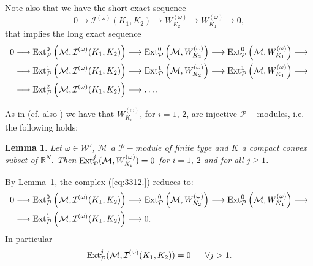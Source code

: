 \documentclass[twoside]{amsart}
\newtheorem{Lemma}[Th]{Lemma}
\begin{document}
Note also that we have the short exact sequence
\[
0\longrightarrow{\mathcal{I}}^{(\omega)}(K_{1},K_{2})\longrightarrow W_{K_{2}}^{(\omega)}
\longrightarrow W_{K_{1}}^{(\omega)}\longrightarrow0,
\]
that implies the long exact sequence
\begin{align}
  0\longrightarrow{\mathop{\rm Ext}\nolimits}_{{\mathcal P}}^{0}\left({\mathcal{M}},{\mathcal{I}}^{(\omega)}(K_{1},K_{2})\right)
  & \longrightarrow{\mathop{\rm Ext}\nolimits}_{{\mathcal P}}^{0}\left({\mathcal{M}},W_{K_{2}}^{(\omega)}\right)
  \longrightarrow{\mathop{\rm Ext}\nolimits}_{{\mathcal P}}^{0}\left({\mathcal{M}},W_{K_{1}}^{(\omega)}\right)
  \longrightarrow
  \nonumber \\
  \longrightarrow{\mathop{\rm Ext}\nolimits}_{{\mathcal P}}^{1}\left({\mathcal{M}},{\mathcal{I}}^{(\omega)}(K_{1},K_{2})\right)
  & \longrightarrow{\mathop{\rm Ext}\nolimits}_{{\mathcal P}}^{1}\left({\mathcal{M}},W_{K_{2}}^{(\omega)}\right)
  \longrightarrow{\mathop{\rm Ext}\nolimits}_{{\mathcal P}}^{1}\left({\mathcal{M}},W_{K_{1}}^{(\omega)}\right)
  \longrightarrow
  \nonumber \\
  \longrightarrow{\mathop{\rm Ext}\nolimits}_{{\mathcal P}}^{2}\left({\mathcal{M}},{\mathcal{I}}^{(\omega)}(K_{1},K_{2})\right)
  & \longrightarrow\ldots.
  \label{eq:3312.}
\end{align}

As in \cite{N1} (cf. also \cite{B,BN1,BN3}) we have
that $W_{K_{i}}^{(\omega)}$, for $i=1,\,2$, are injective ${\mathcal P}-$modules,
i.e. the following holds:

\begin{Lemma}
\label{thm:A1.5-1}
  Let $\omega\in{\mathcal{W}}'$, ${\mathcal{M}}$ a ${\mathcal P}-$module
of finite type and $K$ a compact convex subset of ${\mathbb R}^N$.
Then ${\mathop{\rm Ext}\nolimits}_{{\mathcal P}}^{j}({\mathcal{M}},W_{K_{i}}^{(\omega)})=0$
for $i=1,\,2$ and for all $j\geq1$.
\end{Lemma}

By Lemma~\ref{thm:A1.5-1}, the complex (\ref{eq:3312.}) reduces
to:
\begin{align*}
  0 & \longrightarrow{\mathop{\rm Ext}\nolimits}_{{\mathcal P}}^{0}\left({\mathcal{M}},{\mathcal{I}}^{(\omega)}(K_{1},K_{2})
  \right)\longrightarrow{\mathop{\rm Ext}\nolimits}_{{\mathcal P}}^{0}\left({\mathcal{M}},W_{K_{2}}^{(\omega)}\right)
  \longrightarrow{\mathop{\rm Ext}\nolimits}_{{\mathcal P}}^{0}\left({\mathcal{M}},W_{K_{1}}^{(\omega)}\right)
  \longrightarrow\\
  & \longrightarrow{\mathop{\rm Ext}\nolimits}_{{\mathcal P}}^{1}\left({\mathcal{M}},{\mathcal{I}}^{(\omega)}(K_{1},K_{2})\right)
  \longrightarrow0.
\end{align*}
In particular 
\begin{equation}
  {\mathop{\rm Ext}\nolimits}_{{\mathcal P}}^{j}({\mathcal{M}},{\mathcal{I}}^{(\omega)}(K_{1},K_{2}))=0
  \,\,\,\,\,\,\,\,\,\,\forall j>1.
  \label{eq:(7)}
\end{equation}
\end{document}
